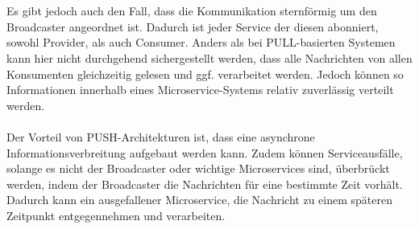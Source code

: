 \\\\
Es gibt jedoch auch den Fall, dass die Kommunikation sternförmig um den Broadcaster angeordnet ist. Dadurch ist jeder Service der diesen abonniert, sowohl Provider, als auch Consumer. Anders als bei PULL-basierten Systemen kann hier nicht durchgehend sichergestellt werden, dass alle Nachrichten von allen Konsumenten gleichzeitig gelesen und ggf. verarbeitet werden. Jedoch können so Informationen innerhalb eines Microservice-Systems relativ zuverlässig verteilt werden.
\\\\
Der Vorteil von PUSH-Architekturen ist, dass eine asynchrone Informationsverbreitung aufgebaut werden kann. Zudem können Serviceausfälle, solange es nicht der Broadcaster oder wichtige Microservices sind, überbrückt werden, indem der Broadcaster die Nachrichten für eine bestimmte Zeit vorhält. Dadurch kann ein ausgefallener Microservice, die Nachricht zu einem späteren Zeitpunkt entgegennehmen und verarbeiten.